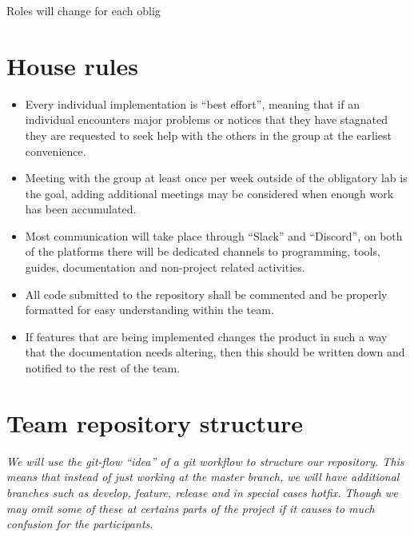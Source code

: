 \documentclass[12pt]{article}%
\begin{document}
Roles will change for each oblig


\section{House rules}


\begin{itemize}
\item Every individual implementation is “best effort”, meaning that if an individual encounters major problems or notices that they have stagnated they are requested to seek help with the others in the group at the earliest convenience.
\item Meeting with the group at least once per week outside of the obligatory lab is the goal, adding additional meetings may be considered when enough work has been accumulated.
\item Most communication will take place through “Slack” and “Discord”, on both of the platforms there will be dedicated channels to programming, tools, guides, documentation and non-project related activities.
\item All code submitted to the repository shall be commented and be properly formatted for easy understanding within the team.
\item If features that are being implemented changes the product in such a way that the documentation needs altering, then this should be written down and notified to the rest of the team.
\end{itemize}


\section{Team repository structure}

\textit{We will use the git-flow “idea” of a git workflow to structure our repository. This means that instead of just working at the master branch, we will have additional branches such as develop, feature, release and in special cases hotfix. Though we may omit some of these at certains parts of the project if it causes to much confusion for the participants.}
\vspace{5mm} %
\end{document}
